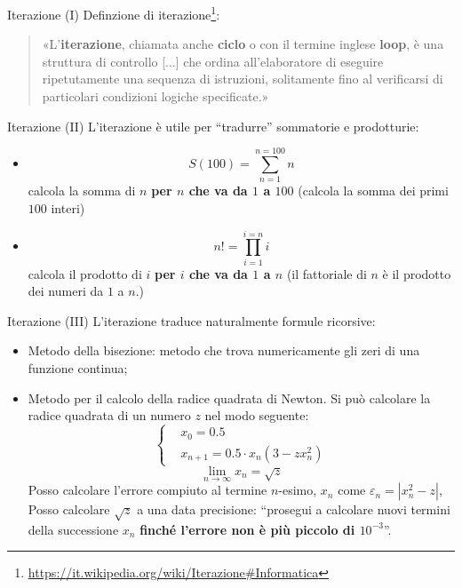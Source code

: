 \begin{frame}{Iterazione (I)}
  Definzione di iterazione\footnote{\url{https://it.wikipedia.org/wiki/Iterazione\#Informatica}}:
  \begin{quote}
    «L'\textbf{iterazione}, chiamata anche \textbf{ciclo} o con il termine inglese \textbf{loop}, 
    è una struttura di controllo [...]  che ordina all'elaboratore di eseguire ripetutamente 
    una sequenza di istruzioni, solitamente fino al verificarsi di particolari condizioni logiche specificate.»
  \end{quote}
\end{frame}

\begin{frame}{Iterazione (II)}
  L'iterazione è utile per ``tradurre'' sommatorie e prodotturie:
  \begin{itemize}
   \item \[S(100) = \sum_{n=1}^{n=100} n\]
	 calcola la somma di $n$ \textbf{per $n$ che va da  $1$ a $100$}
	 (calcola la somma dei primi $100$ interi)
   \item \[n! = \prod_{i=1}^{i=n} i\]
	 calcola il prodotto di $i$ \textbf{per $i$ che va da  $1$ a $n$}
	 (il fattoriale di $n$ \`e il prodotto dei numeri da $1$ a $n$.)
  \end{itemize}

\end{frame}

\begin{frame}{Iterazione (III)}
  L'iterazione traduce naturalmente formule ricorsive:
  \begin{itemize}
    \item Metodo della bisezione: metodo che trova numericamente gli zeri di una funzione continua;

    \item Metodo per il calcolo della radice quadrata di Newton.
    Si può calcolare la radice quadrata di un numero $z$ nel modo seguente:
    \begin{equation*}
      \left\{\begin{aligned}
	  & x_0 = 0.5\\
	  & x_{n +1} = 0.5 \cdot {x_n} (3  - zx^2_n)
      \end{aligned}\right.
    \end{equation*}
    \begin{equation*}
     \lim_{n \to \infty} x_{n} = \sqrt{z}
    \end{equation*}
    Posso calcolare l'errore compiuto al termine $n$-esimo, $x_{n}$ come $\varepsilon_{n} = |x^{2}_{n} - z|$,
    Posso calcolare $\sqrt{z}$ a una data precisione: ``prosegui a calcolare nuovi termini della successione $x_{n}$
    \textbf{finché l'errore non è più piccolo di $10^{-3}$}''.


  \end{itemize}

\end{frame}

